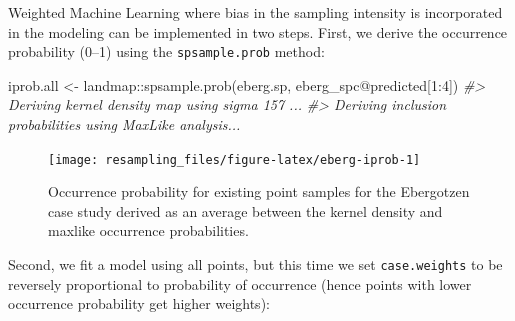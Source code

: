 \documentclass[
  graybox,natbib,nospthms]{svmono}
\newenvironment{Shaded}{\begin{snugshade}}{\end{snugshade}}
\newcommand{\AttributeTok}[1]{\textcolor[rgb]{0.61,0.61,0.61}{#1}}
\newcommand{\CommentTok}[1]{\textcolor[rgb]{0.37,0.37,0.37}{\textit{#1}}}
\newcommand{\DecValTok}[1]{\textcolor[rgb]{0.06,0.06,0.06}{#1}}
\newcommand{\FunctionTok}[1]{\textcolor[rgb]{0,0,0}{#1}}
\newcommand{\NormalTok}[1]{#1}
\newcommand{\OtherTok}[1]{\textcolor[rgb]{0.37,0.37,0.37}{#1}}
\newcommand{\SpecialCharTok}[1]{\textcolor[rgb]{0,0,0}{#1}}
\newcommand{\StringTok}[1]{\textcolor[rgb]{0.5,0.5,0.5}{#1}}
\begin{document}
Weighted Machine Learning where bias in the sampling intensity is incorporated in
the modeling can be implemented in two steps. First, we derive the occurrence
probability (0--1) using the \texttt{spsample.prob} method:

\begin{Shaded}
\begin{Highlighting}[]
\NormalTok{iprob.all }\OtherTok{\textless{}{-}}\NormalTok{ landmap}\SpecialCharTok{::}\FunctionTok{spsample.prob}\NormalTok{(eberg.sp, eberg\_spc}\SpecialCharTok{@}\NormalTok{predicted[}\DecValTok{1}\SpecialCharTok{:}\DecValTok{4}\NormalTok{])}
\CommentTok{\#\textgreater{} Deriving kernel density map using sigma 157 ...}
\CommentTok{\#\textgreater{} Deriving inclusion probabilities using MaxLike analysis...}
\end{Highlighting}
\end{Shaded}

\begin{Shaded}
\end{Shaded}

\begin{figure}

{\centering \texttt{[image: resampling\_files/figure-latex/eberg-iprob-1]} 

}

\caption{Occurrence probability for existing point samples for the Ebergotzen case study derived as an average between the kernel density and maxlike occurrence probabilities.}\label{fig:eberg-iprob}
\end{figure}

Second, we fit a model using all points, but this time we set \texttt{case.weights} to be
reversely proportional to probability of occurrence (hence points with lower occurrence
probability get higher weights):

\begin{Shaded}
\end{Shaded}
\end{document}

